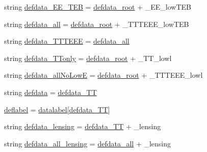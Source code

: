 \begin{DoxyCompactItemize}
string \mbox{\hyperlink{namespaceplanckStyle_a3b6e393ac055ea3838239a5286916db0}{defdata\+\_\+\+E\+E\+\_\+\+T\+EB}} = \mbox{\hyperlink{namespaceplanckStyle_a0e660a6b993d079309a2b0f97276e0d3}{defdata\+\_\+root}} + \textquotesingle{}\+\_\+\+E\+E\+\_\+low\+T\+EB\textquotesingle{}
\item 
string \mbox{\hyperlink{namespaceplanckStyle_ac23576e1aafe24fd074f5450debf6f14}{defdata\+\_\+all}} = \mbox{\hyperlink{namespaceplanckStyle_a0e660a6b993d079309a2b0f97276e0d3}{defdata\+\_\+root}} + \textquotesingle{}\+\_\+\+T\+T\+T\+E\+E\+E\+\_\+low\+T\+EB\textquotesingle{}
\item 
string \mbox{\hyperlink{namespaceplanckStyle_ad2590e12fce49c44c1ff4b57348e652a}{defdata\+\_\+\+T\+T\+T\+E\+EE}} = \mbox{\hyperlink{namespaceplanckStyle_ac23576e1aafe24fd074f5450debf6f14}{defdata\+\_\+all}}
\item 
string \mbox{\hyperlink{namespaceplanckStyle_acce6d3fa6a00f16fb8bcdd3bd3aae9cd}{defdata\+\_\+\+T\+Tonly}} = \mbox{\hyperlink{namespaceplanckStyle_a0e660a6b993d079309a2b0f97276e0d3}{defdata\+\_\+root}} + \textquotesingle{}\+\_\+\+T\+T\+\_\+lowl\textquotesingle{}
\item 
string \mbox{\hyperlink{namespaceplanckStyle_a76ba6d7ecd665439c9b210111dba6206}{defdata\+\_\+all\+No\+LowE}} = \mbox{\hyperlink{namespaceplanckStyle_a0e660a6b993d079309a2b0f97276e0d3}{defdata\+\_\+root}} + \textquotesingle{}\+\_\+\+T\+T\+T\+E\+E\+E\+\_\+lowl\textquotesingle{}
\item 
string \mbox{\hyperlink{namespaceplanckStyle_aea34dae3ec9210712a8386167c59f29c}{defdata}} = \mbox{\hyperlink{namespaceplanckStyle_ae9a486070a1102293ca26bf924f115e2}{defdata\+\_\+\+TT}}
\item 
\mbox{\hyperlink{namespaceplanckStyle_a2dabad242eac009ab5d210414f5eb38e}{deflabel}} = \mbox{\hyperlink{namespaceplanckStyle_a8da1128119eb2cdd66bc98e4099d374c}{datalabel}}\mbox{[}\mbox{\hyperlink{namespaceplanckStyle_ae9a486070a1102293ca26bf924f115e2}{defdata\+\_\+\+TT}}\mbox{]}
\item 
string \mbox{\hyperlink{namespaceplanckStyle_a313a4de00b6651d5ead8b86a584adb63}{defdata\+\_\+lensing}} = \mbox{\hyperlink{namespaceplanckStyle_ae9a486070a1102293ca26bf924f115e2}{defdata\+\_\+\+TT}} + \textquotesingle{}\+\_\+lensing\textquotesingle{}
\item 
string \mbox{\hyperlink{namespaceplanckStyle_ac95fea9e23ed11d50eb8d2f2da4b45d5}{defdata\+\_\+all\+\_\+lensing}} = \mbox{\hyperlink{namespaceplanckStyle_ac23576e1aafe24fd074f5450debf6f14}{defdata\+\_\+all}} + \textquotesingle{}\+\_\+lensing\textquotesingle{}

\end{DoxyCompactItemize}
